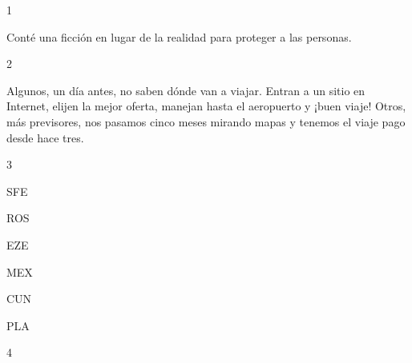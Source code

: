 \documentclass[12pt,twoside,openright,a5paper]{book}
\begin{document}
\hrulefill \hspace{0.1cm}\decofourleft\hspace{0.2cm} 1 \hspace{0.2cm}\decofourright \hspace{0.1cm}\hrulefill

\nopagebreak

\vspace{0.5cm}

\nopagebreak

Conté una ficción en lugar de la realidad para proteger a las personas.

\vspace{0.5cm}

\hrulefill \hspace{0.1cm}\decofourleft\hspace{0.2cm} 2 \hspace{0.2cm}\decofourright \hspace{0.1cm}\hrulefill

\nopagebreak

\vspace{0.5cm}

\nopagebreak

Algunos, un día antes, no saben dónde van a viajar. Entran a un sitio
en Internet, elijen la mejor oferta, manejan hasta el aeropuerto y ¡buen
viaje! Otros, más previsores, nos pasamos cinco meses mirando mapas y
tenemos el viaje pago desde hace tres.

\vspace{0.5cm}

\hrulefill \hspace{0.1cm}\decofourleft\hspace{0.2cm} 3 \hspace{0.2cm}\decofourright \hspace{0.1cm}\hrulefill

\nopagebreak

\vspace{0.5cm}

\nopagebreak

SFE

ROS

EZE

MEX

CUN

PLA

\vspace{0.5cm}

\hrulefill \hspace{0.1cm}\decofourleft\hspace{0.2cm} 4 \hspace{0.2cm}\decofourright \hspace{0.1cm}\hrulefill
\end{document}
